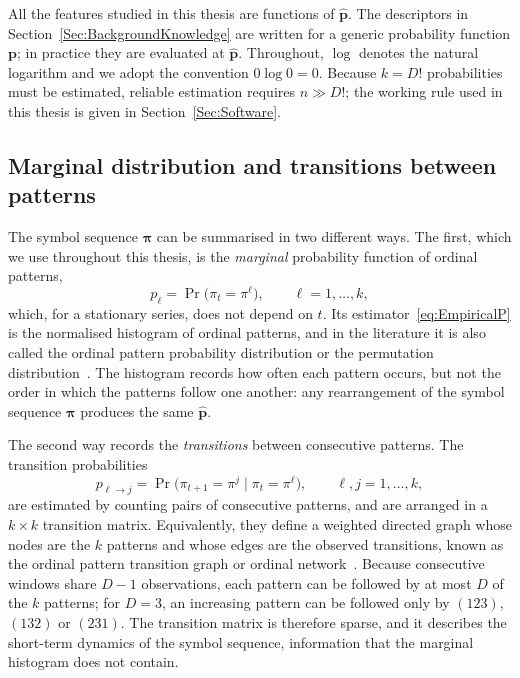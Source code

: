 All the features studied in this thesis are functions of $\widehat{\mathbf{p}}$. The descriptors in Section~\ref{Sec:BackgroundKnowledge} are written for a generic probability function $\mathbf{p}$; in practice they are evaluated at $\widehat{\mathbf{p}}$. Throughout, $\log$ denotes the natural logarithm and we adopt the convention $0\log 0=0$. Because $k=D!$ probabilities must be estimated, reliable estimation requires $n\gg D!$; the working rule used in this thesis is given in Section~\ref{Sec:Software}.

\subsection{Marginal distribution and transitions between patterns}\label{Subsec:MarginalVsTransition}

The symbol sequence $\boldsymbol{\pi}$ can be summarised in two different ways. The first, which we use throughout this thesis, is the \emph{marginal} probability function of ordinal patterns,
\[
p_\ell=\Pr\big(\pi_t=\pi^\ell\big),\qquad \ell=1,\dots,k,
\]
which, for a stationary series, does not depend on $t$. Its estimator~\eqref{eq:EmpiricalP} is the normalised histogram of ordinal patterns, and in the literature it is also called the ordinal pattern probability distribution or the permutation distribution~\cite{Brandmaier2015, Rosso2007}. The histogram records how often each pattern occurs, but not the order in which the patterns follow one another: any rearrangement of the symbol sequence $\boldsymbol{\pi}$ produces the same $\widehat{\mathbf{p}}$.

The second way records the \emph{transitions} between consecutive patterns. The transition probabilities
\[
p_{\ell\to j}=\Pr\big(\pi_{t+1}=\pi^j \mid \pi_t=\pi^\ell\big),\qquad \ell,j=1,\dots,k,
\]
are estimated by counting pairs of consecutive patterns, and are arranged in a $k\times k$ transition matrix. Equivalently, they define a weighted directed graph whose nodes are the $k$ patterns and whose edges are the observed transitions, known as the ordinal pattern transition graph or ordinal network~\cite{Borges2019,McCullough2015,Pessa2021}. Because consecutive windows share $D-1$ observations, each pattern can be followed by at most $D$ of the $k$ patterns; for $D=3$, an increasing pattern can be followed only by $(123)$, $(132)$ or $(231)$. The transition matrix is therefore sparse, and it describes the short-term dynamics of the symbol sequence, information that the marginal histogram does not contain.

